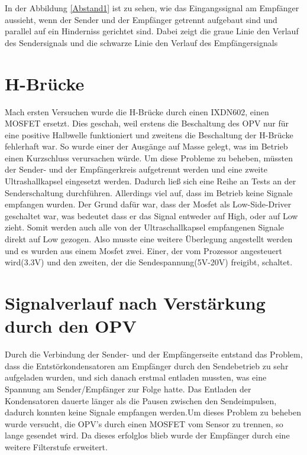 In der Abbildung \ref{Abstand1} ist zu sehen, wie das Eingangssignal am Empfänger aussieht, wenn der Sender und der Empfänger getrennt aufgebaut sind und parallel auf ein Hinderniss gerichtet sind. Dabei zeigt die graue Linie den Verlauf des Sendersignals und die schwarze Linie den Verlauf des Empfängersignals
\section{H-Brücke}
Mach ersten Versuchen wurde die H-Brücke durch einen IXDN602, einen MOSFET ersetzt. Dies geschah, weil erstens die Beschaltung des OPV nur für eine positive Halbwelle funktioniert und zweitens die Beschaltung der H-Brücke fehlerhaft war. So wurde einer der Ausgänge auf Masse gelegt, was im Betrieb einen Kurzschluss verursachen würde. Um diese Probleme zu beheben, müssten der Sender- und der Empfängerkreis aufgetrennt werden und eine zweite Ultrashallkapsel eingesetzt werden. Dadurch ließ sich eine Reihe an Tests an der Senderschaltung durchführen. Allerdings viel auf, dass im Betrieb keine Signale empfangen wurden. Der Grund dafür war, dass der Mosfet als Low-Side-Driver geschaltet war, was bedeutet dass er das Signal entweder auf High, oder auf Low zieht. Somit werden auch alle von der Ultraschallkapsel empfangenen Signale direkt auf Low gezogen. Also musste eine weitere Überlegung angestellt werden und es wurden aus einem Mosfet zwei. Einer, der vom Prozessor angesteuert wird(3.3V) und den zweiten, der die Sendespannung(5V-20V) freigibt, schaltet. 

\section{Signalverlauf nach Verstärkung durch den OPV}
Durch die Verbindung der Sender- und der Empfängerseite entstand das Problem, dass die Entstörkondensatoren am Empfänger durch den Sendebetrieb zu sehr aufgeladen wurden, und sich danach erstmal entladen mussten, was eine Spannung am Sender/Empfänger zur Folge hatte. Das Entladen der Kondensatoren dauerte länger als die Pausen zwischen den Sendeimpulsen, dadurch konnten keine Signale empfangen werden.Um dieses Problem zu beheben wurde versucht, die OPV's durch einen MOSFET vom Sensor zu trennen, so lange gesendet wird. Da dieses erfolglos blieb wurde der Empfänger durch eine weitere Filterstufe erweitert.
